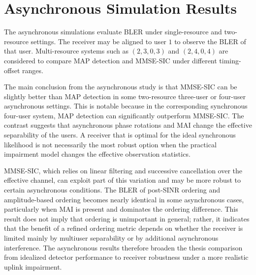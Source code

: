 \section{Asynchronous Simulation Results}

The asynchronous simulations evaluate BLER under single-resource and two-resource settings. The receiver may be aligned to user $1$ to observe the BLER of that user. Multi-resource systems such as $(2,3,0,3)$ and $(2,4,0,4)$ are considered to compare MAP detection and MMSE-SIC under different timing-offset ranges.







The main conclusion from the asynchronous study is that MMSE-SIC can be slightly better than MAP detection in some two-resource three-user or four-user asynchronous settings. This is notable because in the corresponding synchronous four-user system, MAP detection can significantly outperform MMSE-SIC. The contrast suggests that asynchronous phase rotations and MAI change the effective separability of the users. A receiver that is optimal for the ideal synchronous likelihood is not necessarily the most robust option when the practical impairment model changes the effective observation statistics.

MMSE-SIC, which relies on linear filtering and successive cancellation over the effective channel, can exploit part of this variation and may be more robust to certain asynchronous conditions. The BLER of post-SINR ordering and amplitude-based ordering becomes nearly identical in some asynchronous cases, particularly when MAI is present and dominates the ordering difference. This result does not imply that ordering is unimportant in general; rather, it indicates that the benefit of a refined ordering metric depends on whether the receiver is limited mainly by multiuser separability or by additional asynchronous interference. The asynchronous results therefore broaden the thesis comparison from idealized detector performance to receiver robustness under a more realistic uplink impairment.
